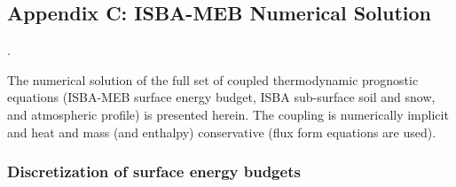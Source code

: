 {\clearpage
\subsection{Appendix C: ISBA-MEB Numerical Solution}
\label{app:meb_numerical_soln}.

The numerical solution of the full set of coupled
thermodynamic 
prognostic equations (ISBA-MEB surface energy budget, ISBA sub-surface
soil and snow, and
atmospheric profile)
is presented herein.
The coupling is numerically implicit and heat and mass 
(and enthalpy) conservative (flux form equations are used).

\subsubsection{Discretization of surface energy budgets}
\label{sec:meb_discret_ebud}

}
